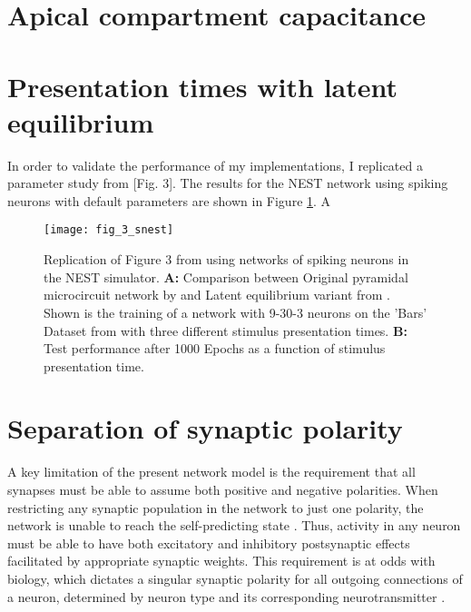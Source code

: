 \section{Apical compartment capacitance}




\section{Presentation times with latent equilibrium}\label{sec-le-tpres}

In order to validate the performance of my implementations, I replicated a parameter study from \cite{Haider2021}[Fig.
    3]. The results for the NEST network using spiking neurons with default parameters  are
    shown in Figure \ref{fig-bars-le-snest}. A



\begin{figure}[t]
    \centering
    \texttt{[image: fig\_3\_snest]}
    \caption{Replication of Figure 3 from \cite{Haider2021} using networks of spiking neurons in the NEST simulator.
        \textbf{A:} Comparison between Original pyramidal microcircuit network by \cite{sacramento2018dendritic} and
        Latent equilibrium variant from \cite{Haider2021}. Shown is the training of a network with 9-30-3 neurons on the
        'Bars' Dataset from  with three different stimulus presentation times. \textbf{B:} Test
        performance after 1000 Epochs as a function of stimulus presentation time.}
    \label{fig-bars-le-snest}
\end{figure}


\section{Separation of synaptic polarity}

A key limitation of the present network model is the requirement that all synapses must be able to assume both positive
and negative polarities. When restricting any synaptic population in the network to just one polarity, the network is
unable to reach the self-predicting state . Thus, activity in any neuron must be able to have both
excitatory and inhibitory postsynaptic effects facilitated by appropriate synaptic weights. This requirement is at odds
with biology, which dictates a singular synaptic polarity for all outgoing connections of a neuron, determined by neuron
type and its corresponding neurotransmitter \citeme.


